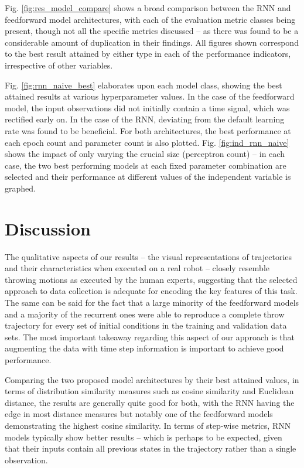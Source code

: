 \documentclass{article}
\begin{document}
Fig. \ref{fig:res_model_compare} shows a broad comparison between the RNN and feedforward model architectures, with each of the evaluation metric classes being present, though not all the specific metrics discussed -- as there was found to be a considerable amount of duplication in their findings. All figures shown correspond to the best result attained by either type in each of the performance indicators, irrespective of other variables. 

Fig. \ref{fig:rnn_naive_best} elaborates upon each model class, showing the best attained results at various hyperparameter values. In the case of the feedforward model, the input observations did not initially contain a time signal, which was rectified early on. In the case of the RNN, deviating from the default learning rate was found to be beneficial. For both architectures, the best performance at each epoch count and parameter count is also plotted. Fig. \ref{fig:ind_rnn_naive} shows the impact of only varying the crucial size (perceptron count) -- in each case, the two best performing models at each fixed parameter combination are selected and their performance at different values of the independent variable is graphed. 

\section{Discussion}
\label{sec:discussion}

The qualitative aspects of our results -- the visual representations of trajectories and their characteristics when executed on a real robot -- closely resemble throwing motions as executed by the human experts, suggesting that the selected approach to data collection is adequate for encoding the key features of this task. The same can be said for the fact that a large minority of the feedforward models and a majority of the recurrent ones were able to reproduce a complete throw trajectory for every set of initial conditions in the training and validation data sets. The most important takeaway regarding this aspect of our approach is that augmenting the data with time step information is important to achieve good performance.

Comparing the two proposed model architectures by their best attained values, in terms of distribution similarity measures such as cosine similarity and Euclidean distance, the results are generally quite good for both, with the RNN having the edge in most distance measures but notably one of the feedforward models demonstrating the highest cosine similarity. In terms of step-wise metrics, RNN models typically show better results -- which is perhaps to be expected, given that their inputs contain all previous states in the trajectory rather than a single observation. 
\end{document}
